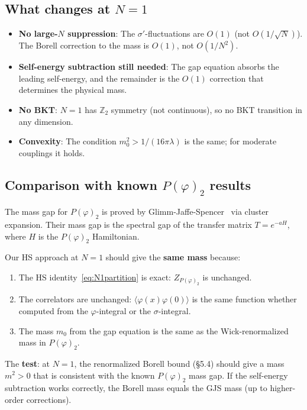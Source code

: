 \documentclass[12pt]{article}
\theoremstyle{definition}
\theoremstyle{remark}
\newcommand{\Z}{\mathbb{Z}}
\newcommand{\ph}{\varphi}
\begin{document}
\subsection{What changes at $N = 1$}

\begin{itemize}
\item \textbf{No large-$N$ suppression}: The $\sigma'$-fluctuations
  are $O(1)$ (not $O(1/\sqrt{N})$). The Borell correction to the
  mass is $O(1)$, not $O(1/N^2)$.
\item \textbf{Self-energy subtraction still needed}: The gap equation
  absorbs the leading self-energy, and the remainder is the $O(1)$
  correction that determines the physical mass.
\item \textbf{No BKT}: $N=1$ has $\Z_2$ symmetry (not continuous),
  so no BKT transition in any dimension.
\item \textbf{Convexity}: The condition $m_0^2 > 1/(16\pi\lambda)$
  is the same; for moderate couplings it holds.
\end{itemize}

\subsection{Comparison with known $P(\ph)_2$ results}

The mass gap for $P(\ph)_2$ is proved by
Glimm-Jaffe-Spencer~\cite{GJS74} via cluster expansion. Their mass
gap is the spectral gap of the transfer matrix $T = e^{-aH}$, where
$H$ is the $P(\ph)_2$ Hamiltonian.

Our HS approach at $N=1$ should give the \textbf{same mass} because:
\begin{enumerate}
\item The HS identity~\eqref{eq:N1partition} is exact: $Z_{P(\ph)_2}$
  is unchanged.
\item The correlators are unchanged: $\langle\ph(x)\ph(0)\rangle$ is
  the same function whether computed from the $\ph$-integral or the
  $\sigma$-integral.
\item The mass $m_0$ from the gap equation is the same as the
  Wick-renormalized mass in $P(\ph)_2$.
\end{enumerate}

The \textbf{test}: at $N=1$, the renormalized Borell bound (\S5.4)
should give a mass $m^2 > 0$ that is consistent with the known
$P(\ph)_2$ mass gap. If the self-energy subtraction works correctly,
the Borell mass equals the GJS mass (up to higher-order corrections).
\end{document}
